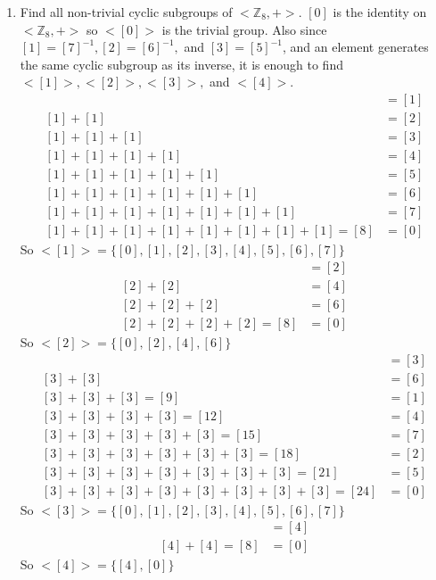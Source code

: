 \documentclass{article}
\begin{document}
\begin{enumerate}
\item Find all non-trivial cyclic subgroups of $<\mathbb{Z}_8,+>$.  $[0]$ is the identity on $<\mathbb{Z}_8,+>$ so $<[0]>$ is the trivial group.  Also since $[1]=[7]^{-1}, [2]=[6]^{-1},$ and $[3]=[5]^{-1}$, and an element generates the same cyclic subgroup as its inverse, it is enough to find $<[1]>,<[2]>,<[3]>,$ and $<[4]>$.  \begin{align*}
    [1]&=[1] \\
    [1]+[1]&=[2] \\
    [1]+[1]+[1]&=[3] \\
    [1]+[1]+[1]+[1]&=[4] \\
    [1]+[1]+[1]+[1]+[1]&=[5] \\
    [1]+[1]+[1]+[1]+[1]+[1]&=[6] \\
    [1]+[1]+[1]+[1]+[1]+[1]+[1]&=[7] \\
    [1]+[1]+[1]+[1]+[1]+[1]+[1]+[1]=[8]&=[0]
\end{align*}
So $<[1]>=\{[0],[1],[2],[3],[4],[5],[6],[7]\}$
\begin{align*}
    [2]&=[2] \\
    [2]+[2]&=[4] \\
    [2]+[2]+[2]&=[6]\\
    [2]+[2]+[2]+[2]=[8]&=[0]
\end{align*}
So $<[2]>=\{[0],[2],[4],[6]\}$
\begin{align*}
    [3]&=[3] \\
    [3]+[3]&=[6] \\
    [3]+[3]+[3]=[9]&=[1] \\
    [3]+[3]+[3]+[3]=[12]&=[4] \\
    [3]+[3]+[3]+[3]+[3]=[15]&=[7] \\
    [3]+[3]+[3]+[3]+[3]+[3]=[18]&=[2] \\
    [3]+[3]+[3]+[3]+[3]+[3]+[3]=[21]&=[5] \\
    [3]+[3]+[3]+[3]+[3]+[3]+[3]+[3]=[24]&=[0]
\end{align*}
So $<[3]>=\{[0],[1],[2],[3],[4],[5],[6],[7]\}$
\begin{align*}
    [4]&=[4] \\
    [4]+[4]=[8]&=[0]
\end{align*}
So $<[4]>=\{[4],[0]\}$

\end{enumerate}
\end{document}
